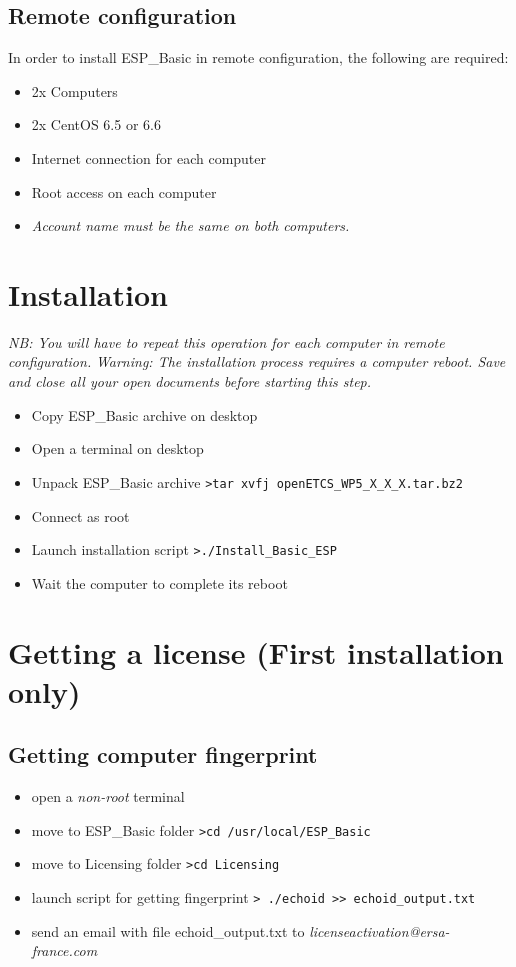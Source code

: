 \subsection{Remote configuration}
In order to install ESP\_Basic in remote configuration, the following are required:
\begin{itemize}
\item 2x Computers
\item 2x CentOS 6.5 or 6.6
\item Internet connection for each computer
\item Root access on each computer
\item \emph{Account name must be the same on both computers.}
\end{itemize}

\section{Installation}
\emph{NB: You will have to repeat this operation for each computer in remote configuration.}
\newline
\emph{Warning: The installation process requires a computer reboot. Save and close all your open documents before starting this step.}
\begin{itemize}
\item Copy ESP\_Basic archive on desktop
\item Open a terminal on desktop
\item Unpack ESP\_Basic archive
	\newline
	\verb|>tar xvfj openETCS_WP5_X_X_X.tar.bz2 |
\item Connect as root
\item Launch installation script
	\newline
	\verb|>./Install_Basic_ESP |
\item Wait the computer to complete its reboot
\end{itemize}

\section{Getting a license (First installation only)}
\subsection{Getting computer fingerprint}
\begin{itemize}
	\item open a \emph{non-root} terminal
	\item move to ESP\_Basic folder
	\newline
	\verb|>cd /usr/local/ESP_Basic |          
	\item move to Licensing folder
	\newline
	\verb|>cd Licensing |
	\item launch script for getting fingerprint
	\newline
	\verb|> ./echoid >> echoid_output.txt|            
	\item send an email with file echoid\_output.txt to \emph{licenseactivation@ersa-france.com}
\end{itemize}

